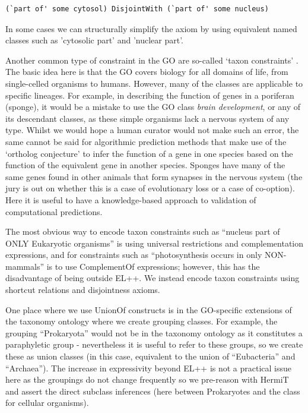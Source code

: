 \documentclass{llncs}
\begin{document}
\begin{verbatim}
(`part of' some cytosol) DisjointWith (`part of' some nucleus)
\end{verbatim}

In some cases we can structurally simplify the axiom by using
equivalent named classes such as 'cytosolic part' and 'nuclear
part'. 

Another common type of constraint in the GO are so-called `taxon
constraints' \cite{Deegan2010}. The basic idea here is that the GO
covers biology for all domains of life, from single-celled organisms
to humans. However, many of the classes are applicable to specific
lineages. For example, in describing the function of genes in a
poriferan (sponge), it would be a mistake to use the GO class \emph{brain
development}, or any of its descendant classes, as these simple
organisms lack a nervous system of any type. Whilst we would hope a
human curator would not make such an error, the same cannot be said
for algorithmic prediction methods that make use of the `ortholog
conjecture'\cite{Thomas2012} to infer the function of a gene in one
species based on the function of the equivalent gene in another
species. Sponges have many of the same genes found in other animals
that form synapses in the nervous system (the jury is out on whether
this is a case of evolutionary loss or a case of co-option). Here it
is useful to have a knowledge-based approach to validation of
computational predictions.

The most obvious way to encode taxon constraints such as ``nucleus
part of ONLY Eukaryotic organisms'' is using universal restrictions
and complementation expressions, and for constraints such as
``photosynthesis occurs in only NON-mammals'' is to use ComplementOf
expressions; however, this has the disadvantage of being outside
EL++. We instead encode taxon constraints using shortcut
relations\cite{mungall2010shortcuts} and disjointness
axioms\cite{taxonOWL}.

One place where we use UnionOf constructs is in the GO-specific
extensions of the taxonomy ontology where we create grouping
classes. For example, the grouping ``Prokaryota'' would not be
in the taxonomy ontology as it constitutes a paraphyletic group -
nevertheless it is useful to refer to these groups, so we
create these as union classes (in this case, equivalent to the union
of ``Eubacteria'' and ``Archaea''). The increase in expressivity
beyond EL++ is not a practical issue here as the groupings do not
change frequently so we pre-reason with HermiT and assert the direct subclass
inferences (here between Prokaryotes and the class for cellular
organisms).
\end{document}
